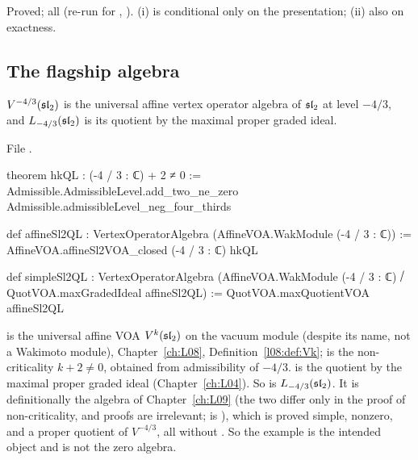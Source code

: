 \begin{status}
Proved; all \lean{[propext, Classical.}\allowbreak{}\allowbreak\lean{sound]} (re-run for , ). (i) is
conditional only on the presentation; (ii) also on exactness.
\end{status}

\subsection{The flagship algebra}

\begin{definition}\label{l16:def:flagship}
$V^{-4/3}(\mathfrak{sl}_2)$ is the universal affine vertex operator algebra of $\mathfrak{sl}_2$ at level $-4/3$, and
$L_{-4/3}(\mathfrak{sl}_2)$ is its quotient by the maximal proper graded ideal.
\end{definition}
\noindent File .
\begin{leancode}
theorem hkQL : (-4 / 3 : ℂ) + 2 ≠ 0 :=
  Admissible.AdmissibleLevel.add_two_ne_zero Admissible.admissibleLevel_neg_four_thirds

def affineSl2QL : VertexOperatorAlgebra (AffineVOA.WakModule (-4 / 3 : ℂ)) :=
  AffineVOA.affineSl2VOA_closed (-4 / 3 : ℂ) hkQL

def simpleSl2QL :
    VertexOperatorAlgebra (AffineVOA.WakModule (-4 / 3 : ℂ) ⧸ QuotVOA.maxGradedIdeal affineSl2QL) :=
  QuotVOA.maxQuotientVOA affineSl2QL
\end{leancode}

\begin{dictionary}
\allowbreak{} is the universal affine VOA $V^k(\mathfrak{sl}_2)$ on the vacuum module 
(despite its name, not a Wakimoto module), Chapter~\ref{ch:L08}, Definition~\ref{l08:def:Vk};  is the
non-criticality $k+2\ne0$, obtained from admissibility of $-4/3$.  is the quotient by the maximal proper
graded ideal (Chapter~\ref{ch:L04}). So  is $L_{-4/3}(\mathfrak{sl}_2)$. It is definitionally the algebra
 of Chapter~\ref{ch:L09} (the two differ only in the proof of non-criticality, and proofs are
irrelevant; \allowbreak{} is ), which is proved simple, nonzero, and a proper quotient of
$V^{-4/3}$, all without . So the example is the intended object and is not the zero algebra.
\end{dictionary}

